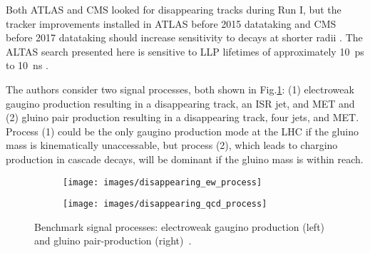 \documentclass[12pt]{article}
\begin{document}
        Both ATLAS and CMS looked for disappearing tracks during Run I, but the tracker improvements installed in ATLAS before 2015 datataking and CMS before 2017 datataking should increase sensitivity to decays at shorter radii . The ALTAS search presented here is sensitive to LLP lifetimes of approximately \SI{10}{\pico\s} to \SI{10}{\nano\s} .

        The authors consider two signal processes, both shown in Fig.\ref{disappearing_processes}: (1) electroweak gaugino production resulting in a disappearing track, an ISR jet, and MET and (2) gluino pair production resulting in a disappearing track, four jets, and MET. Process (1) could be the only gaugino production mode at the LHC if the gluino mass is kinematically unaccessable, but process (2), which leads to chargino production in cascade decays, will be dominant if the gluino mass is within reach.

        \noindent \begin{figure}[htbp] \begin{center}
        \begin{subfigure}[htbp]{0.2\textwidth} \begin{center}
        \texttt{[image: images/disappearing\_ew\_process]}
        \end{center} \end{subfigure}
        \qquad
        \begin{subfigure}[htbp]{0.2\textwidth} \begin{center}
        \texttt{[image: images/disappearing\_qcd\_process]}
        \end{center} \end{subfigure}
            \caption{Benchmark signal processes: electroweak gaugino production (left) and gluino pair-production (right)~\cite{atlas_disappearing}.}
        \label{disappearing_processes}
        \end{center} \end{figure}
\end{document}

